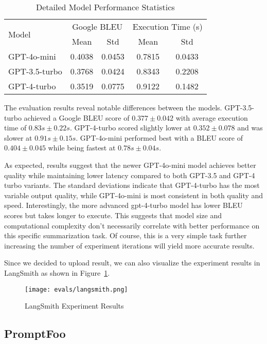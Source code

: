     
\begin{table}[h]
\centering
\begin{tabular}{lcccc}
\hline
\multirow{2}{*}{Model} & \multicolumn{2}{c}{Google BLEU} & \multicolumn{2}{c}{Execution Time (s)} \\
\cline{2-5}
& Mean & Std & Mean & Std \\
\hline
GPT-4o-mini & 0.4038 & 0.0453 & 0.7815 & 0.0433 \\
GPT-3.5-turbo & 0.3768 & 0.0424 & 0.8343 & 0.2208 \\
GPT-4-turbo & 0.3519 & 0.0775 & 0.9122 & 0.1482 \\
\hline
\end{tabular}
\caption{Detailed Model Performance Statistics}
\label{tab:model-stats}
\end{table}
The evaluation results reveal notable differences between the models. GPT-3.5-turbo achieved a Google BLEU score of $0.377 \pm 0.042$ with average execution time of $0.83s \pm 0.22s$. GPT-4-turbo scored slightly lower at $0.352 \pm 0.078$ and was slower at $0.91s \pm 0.15s$. GPT-4o-mini performed best with a BLEU score of $0.404 \pm 0.045$ while being fastest at $0.78s \pm 0.04s$.

As expected, results suggest that the newer GPT-4o-mini model achieves better quality while maintaining lower latency compared to both GPT-3.5 and GPT-4 turbo variants. The standard deviations indicate that GPT-4-turbo has the most variable output quality, while GPT-4o-mini is most consistent in both quality and speed. Interestingly, the more advanced gpt-4-turbo model has lower BLEU scores but takes longer to execute. This suggests that model size and computational complexity don't necessarily correlate with better performance on this specific summarization task. Of course, this is a very simple task further increasing the number of experiment iterations will yield more accurate results.

Since we decided to upload result, we can also visualize the experiment results in LangSmith as shown in Figure~\ref{fig:langsmith}.

\begin{figure}[h]
\centering
\texttt{[image: evals/langsmith.png]}
\label{fig:langsmith}
\caption{LangSmith Experiment Results}
\end{figure}
\subsection{PromptFoo}

